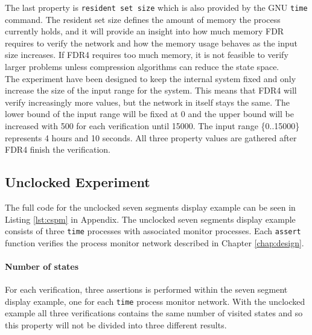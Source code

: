 The last property is \texttt{resident set size} which is also provided by the GNU \texttt{time} command. The resident set size defines the amount of memory the process currently holds, and it will provide an insight into how much memory FDR requires to verify the network and how the memory usage behaves as the input size increases. If FDR4 requires too much memory, it is not feasible to verify larger problems unless compression algorithms can reduce the state space. \\

The experiment have been designed to keep the internal system fixed and only increase the size of the input range for the system. This means that FDR4 will verify increasingly more values, but the network in itself stays the same.
The lower bound of the input range will be fixed at 0 and the upper bound will be increased with 500 for each verification until 15000. The input range \{0..15000\} represents 4 hours and 10 seconds. All three property values are gathered after FDR4 finish the verification.
\subsection{Unclocked Experiment}
The full code for the unclocked seven segments display example can be seen in Listing \ref{lst:cspm} in Appendix. %
The unclocked seven segments display example consists of three \texttt{time} processes with associated monitor processes. Each \texttt{assert} function verifies the process monitor network described in Chapter \ref{chap:design}.
\paragraph{Number of states}
For each verification, three assertions is performed within the seven segment display example, one for each \texttt{time} process monitor network. With the unclocked example all three verifications contains the same number of visited states and so this property will not be divided into three different results.\\

